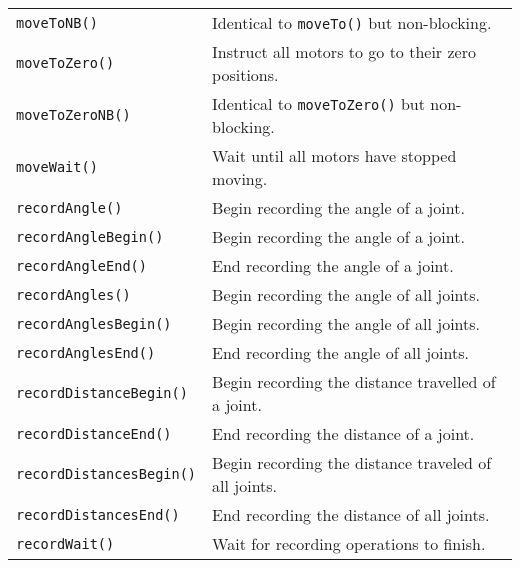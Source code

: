 \begin{table}[!h]
\begin{center}
\begin{tabular}{p{48 mm}p{110 mm}}
\texttt{moveToNB()} & Identical to \texttt{moveTo()} but non-blocking. \\
\texttt{moveToZero()} & Instruct all motors to go to their zero positions. \\
\texttt{moveToZeroNB()} & Identical to \texttt{moveToZero()} but non-blocking. \\
\texttt{moveWait()} & Wait until all motors have stopped moving. \\
\texttt{recordAngle()} & Begin recording the angle of a joint. \\
\texttt{recordAngleBegin()} & Begin recording the angle of a joint. \\
\texttt{recordAngleEnd()} & End recording the angle of a joint. \\
\texttt{recordAngles()} & Begin recording the angle of all joints. \\
\texttt{recordAnglesBegin()} & Begin recording the angle of all joints. \\
\texttt{recordAnglesEnd()} & End recording the angle of all joints. \\
\texttt{recordDistanceBegin()} & Begin recording the distance travelled of a joint. \\
\texttt{recordDistanceEnd()} & End recording the distance of a joint. \\
\texttt{recordDistancesBegin()} & Begin recording the distance traveled of all joints. \\
\texttt{recordDistancesEnd()} & End recording the distance of all joints. \\
\texttt{recordWait()} & Wait for recording operations to finish. \\
\hline
\end{tabular}
\end{center}
\label{mobilec_api_cbinary}
\end{table}

\addtocounter{table}{-1}

